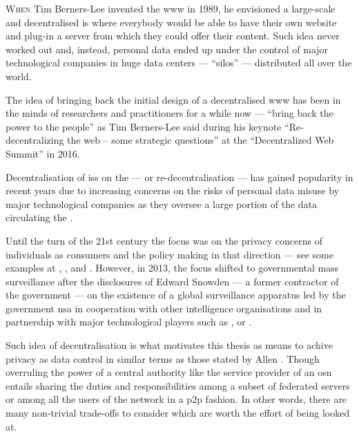 \documentclass[showtrims,oldfontcommands]{kthesis}
\begin{document}
\lettrine{\textcolor[gray]{.25}{W}}{hen} Tim Berners-Lee invented the \Ac{www} in 
1989, he envisioned a large-scale and decentralised \ac{is} where everybody would 
be able to have their own website and plug-in a server from which they could offer 
their content. Such idea never worked out and, instead, personal data ended up under 
the control of major technological companies in huge data centers --- ``silos'' 
--- distributed all over the world.

The idea of bringing back the initial design of a decentralised \ac{www} has been 
in the minds of researchers and practitioners for a while now --- ``bring back the 
power to the people'' as Tim Berners-Lee said during his keynote ``Re-decentralizing 
the web -- some strategic questions'' at the ``Decentralized Web Summit'' in 2016. 

Decentralisation of \acp{is} on the \Internet --- or re-decentralisation --- has 
gained popularity in recent years due to increasing concerns on the risks of personal 
data misuse by major technological companies as they oversee a large portion of 
the data circulating the \Internet.

Until the turn of the 21st century the focus was on the privacy concerns of individuals 
as consumers and the policy making in that direction --- see some examples at \cite{MilbergBSK95}, 
\cite{Rindfleisch97}, \cite{Clarke99} and \cite{NamSPI06}. However, in 2013, the 
focus shifted to governmental mass surveillance after the disclosures of Edward 
Snowden --- a former contractor of the  government --- on the existence 
of a global surveillance apparatus led by the  government \Ac{nsa} in cooperation 
with other intelligence organisations and in partnership with major technological 
players such as \Google, \Facebook or \Apple. 

Such idea of decentralisation is what motivates this thesis as means to achive 
privacy as data control in similar terms as those stated by Allen \cite{Allen99}. 
Though overruling the power of a central authority like the service provider of 
an \ac{osn} entails sharing the duties and responsibilities among a subset of federated 
servers or among all the users of the network in a \ac{p2p} fashion. In other words, 
there are many non-trivial trade-offs to consider which are worth the effort of 
being looked at.
\end{document}
